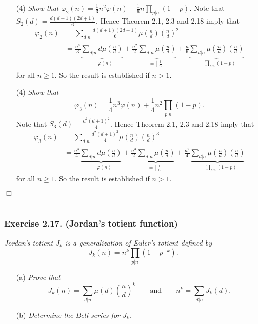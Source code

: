 \documentclass{article}
\begin{document}
\begin{enumerate}
\item[(4)]
  \emph{Show that $\varphi_2(n) = \frac{1}{3}n^2 \varphi(n) + \frac{1}{6} n\prod_{p|n}(1-p)$.}
  Note that $S_2(d) = \frac{d(d+1)(2d+1)}{6}$.
  Hence Theorem 2.1, 2.3 and 2.18 imply that
  \begin{align*}
    \varphi_2(n)
    &= \sum_{d|n} \frac{d(d+1)(2d+1)}{6} \mu\left(\frac{n}{d}\right) \left(\frac{n}{d}\right)^2 \\
    &= \frac{n^2}{3} \underbrace{\sum_{d|n} d \mu\left(\frac{n}{d}\right)}_{= \varphi(n)}
        + \frac{n^2}{2}
            \underbrace{\sum_{d|n} \mu\left(\frac{n}{d}\right)}_{= \left\lfloor \frac{1}{n} \right\rfloor}
        + \frac{n}{6}
            \underbrace{\sum_{d|n} \mu\left(\frac{n}{d}\right)\left(\frac{n}{d}\right)}_{
                = \prod_{p|n}(1 - p)}
  \end{align*}
  for all $n \geq 1$.
  So the result is established if $n > 1$.

\item[(4)]
  \emph{Show that}
  \[
    \varphi_3(n) = \frac{1}{4}n^3 \varphi(n) + \frac{1}{4} n^2 \prod_{p|n}(1-p).
  \]
  Note that $S_3(d) = \frac{d^2(d+1)^2}{4}$.
  Hence Theorem 2.1, 2.3 and 2.18 imply that
  \begin{align*}
    \varphi_3(n)
    &= \sum_{d|n} \frac{d^2(d+1)^2}{4} \mu\left(\frac{n}{d}\right) \left(\frac{n}{d}\right)^3 \\
    &= \frac{n^3}{4} \underbrace{\sum_{d|n} d \mu\left(\frac{n}{d}\right)}_{= \varphi(n)}
        + \frac{n^3}{2}
            \underbrace{\sum_{d|n} \mu\left(\frac{n}{d}\right)}_{= \left\lfloor \frac{1}{n} \right\rfloor}
        + \frac{n^2}{4}
            \underbrace{\sum_{d|n} \mu\left(\frac{n}{d}\right)\left(\frac{n}{d}\right)}_{
                = \prod_{p|n}(1 - p)}
  \end{align*}
  for all $n \geq 1$.
  So the result is established if $n > 1$.
\end{enumerate}
$\Box$ \\\\






\subsubsection*{Exercise 2.17. (Jordan's totient function)}
\emph{Jordan's totient $J_k$ is a generalization of Euler’s totient defined by}
\[
  J_k(n) = n^k \prod_{p|n}(1 - p^{-k}).
\]
\begin{enumerate}
\item[(a)]
  \emph{Prove that
  \[
    J_k(n) = \sum_{d|n} \mu(d) \left( \frac{n}{d} \right)^k
    \qquad
    \text{and}
    \qquad
    n^k = \sum_{d|n} J_k(d).
  \]}
\item[(b)]
  \emph{Determine the Bell series for $J_k$.} \\
\end{enumerate}
\end{document}
